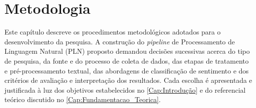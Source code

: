 \chapter{Metodologia} \label{Cap:Metodologia}

Este capítulo descreve os procedimentos metodológicos adotados para o desenvolvimento da pesquisa. A construção do \textit{pipeline} de Processamento de Linguagem Natural (PLN) proposto demandou decisões sucessivas acerca do tipo de pesquisa, da fonte e do processo de coleta de dados, das etapas de tratamento e pré-processamento textual, das abordagens de classificação de sentimento e dos critérios de avaliação e interpretação dos resultados. Cada escolha é apresentada e justificada à luz dos objetivos
estabelecidos no \autoref{Cap:Introdução} e do referencial teórico discutido no \autoref{Cap:Fundamentacao_Teorica}.








%
%